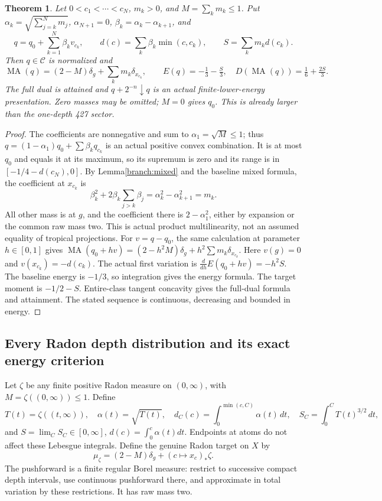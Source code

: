 \documentclass[11pt]{article}
\newtheorem{theorem}{Theorem}
\newcommand{\MA}{\operatorname{MA}}
\newcommand{\C}{\mathcal C}
\begin{document}
\begin{theorem}\label{branch:finite}
Let $0<c_1<\cdots<c_N$, $m_k>0$, and $M=\sum_km_k\le1$.
Put $\alpha_k=\sqrt{\sum_{j=k}^Nm_j}$, $\alpha_{N+1}=0$,
$\beta_k=\alpha_k-\alpha_{k+1}$, and
\[
 q=q_0+\sum_{k=1}^N\beta_kv_{c_k},\qquad
 d(c)=\sum_k\beta_k\min(c,c_k),\qquad S=\sum_km_kd(c_k).
\]
Then $q\in\C$ is normalized and
\[
 \MA(q)=(2-M)\delta_g+\sum_km_k\delta_{x_{c_k}},\qquad
 E(q)=-\tfrac13-\tfrac S3,\quad
 D(\MA(q))=\tfrac16+\tfrac{2S}3.
\]
The full dual is attained and $q+2^{-n}\downarrow q$ is an actual
finite-lower-energy presentation. Zero masses may be omitted; $M=0$
gives $q_0$. This is already larger than the one-depth 427 sector.
\end{theorem}
\begin{proof}
The coefficients are nonnegative and sum to $\alpha_1=\sqrt M\le1$;
thus $q=(1-\alpha_1)q_0+\sum\beta_kq_{c_k}$ is an actual positive
convex combination. It is at most $q_0$ and equals it at its maximum,
so its supremum is zero and its range is in $[-1/4-d(c_N),0]$.
By Lemma\ref{branch:mixed} and the baseline mixed formula, the coefficient
at $x_{c_k}$ is
\[
 \beta_k^2+2\beta_k\sum_{j>k}\beta_j
 =\alpha_k^2-\alpha_{k+1}^2=m_k.
\]
All other mass is at $g$, and the coefficient there is $2-\alpha_1^2$,
either by expansion or the common raw mass two. This is actual product
multilinearity, not an assumed equality of tropical projections.
For $v=q-q_0$, the same calculation at parameter $h\in[0,1]$ gives
$\MA(q_0+hv)=(2-h^2M)\delta_g+h^2\sum m_k\delta_{x_{c_k}}$.
Here $v(g)=0$ and $v(x_{c_k})=-d(c_k)$. The actual first variation is
$\frac{d}{dh}E(q_0+hv)=-h^2S$. The baseline energy is $-1/3$,
so integration gives the energy formula. The target moment is $-1/2-S$.
Entire-class tangent concavity gives the full-dual formula and attainment.
The stated sequence is continuous, decreasing and bounded in energy.
\end{proof}

\subsection{Every Radon depth distribution and its exact energy criterion}
Let $\zeta$ be any finite positive Radon measure on $(0,\infty)$, with
$M=\zeta((0,\infty))\le1$. Define
\[
 T(t)=\zeta((t,\infty)),\quad \alpha(t)=\sqrt{T(t)},\quad
 d_C(c)=\int_0^{\min(c,C)}\alpha(t)\,dt,\quad
 S_C=\int_0^C T(t)^{3/2}\,dt,
\]
and $S=\lim_CS_C\in[0,\infty]$, $d(c)=\int_0^c\alpha(t)dt$.
Endpoints at atoms do not affect these Lebesgue integrals.
Define the genuine Radon target on $X$ by
\[
 \mu_\zeta=(2-M)\delta_g+(c\mapsto x_c)_*\zeta.
\]
The pushforward is a finite regular Borel measure: restrict to successive
compact depth intervals, use continuous pushforward there, and approximate
in total variation by these restrictions. It has raw mass two.
\end{document}
